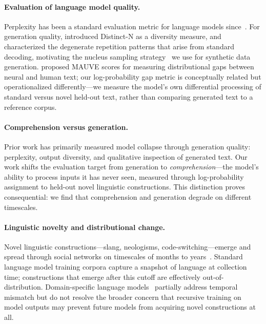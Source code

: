 \documentclass{article}
\begin{document}
\paragraph{Evaluation of language model quality.}
Perplexity has been a standard evaluation metric for language models since~\citet{jelinek1977perplexity}.
For generation quality, \citet{li2016diversity} introduced Distinct-N as a diversity measure, and \citet{holtzman2020curious} characterized the degenerate repetition patterns that arise from standard decoding, motivating the nucleus sampling strategy~\citep{fan2018hierarchical} we use for synthetic data generation.
\citet{pillutla2021mauve} proposed MAUVE scores for measuring distributional gaps between neural and human text; our log-probability gap metric is conceptually related but operationalized differently---we measure the model's own differential processing of standard versus novel held-out text, rather than comparing generated text to a reference corpus.

\paragraph{Comprehension versus generation.}
Prior work has primarily measured model collapse through generation quality: perplexity, output diversity, and qualitative inspection of generated text.
Our work shifts the evaluation target from generation to \emph{comprehension}---the model's ability to process inputs it has never seen, measured through log-probability assignment to held-out novel linguistic constructions.
This distinction proves consequential: we find that comprehension and generation degrade on different timescales.

\paragraph{Linguistic novelty and distributional change.}
Novel linguistic constructions---slang, neologisms, code-switching---emerge and spread through social networks on timescales of months to years~\citep{eisenstein2014systematic,stewart2018language}.
Standard language model training corpora capture a snapshot of language at collection time; constructions that emerge after this cutoff are effectively out-of-distribution.
Domain-specific language models~\citep{nguyen2020bertweet} partially address temporal mismatch but do not resolve the broader concern that recursive training on model outputs may prevent future models from acquiring novel constructions at all.
\end{document}
